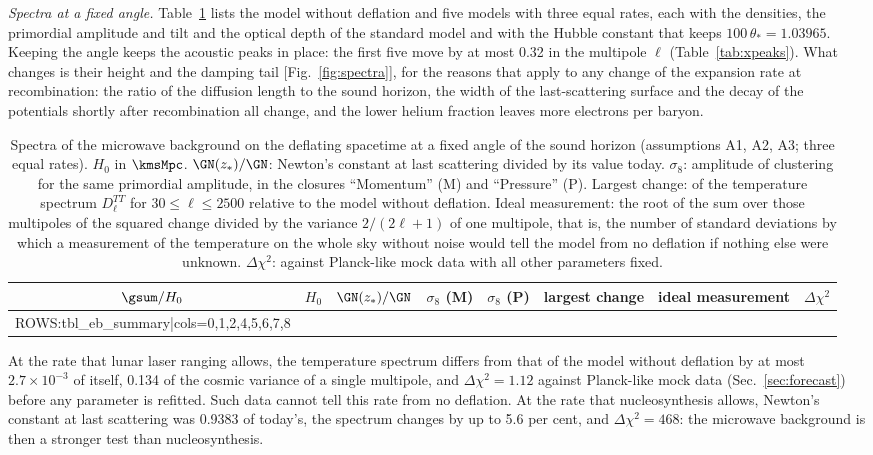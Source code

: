 \emph{Spectra at a fixed angle.} Table~\ref{tab:spectra} lists the model without deflation and
five models with three equal rates, each with the densities, the primordial amplitude and tilt and the optical depth of the standard
model and with the Hubble constant that keeps $100\,\theta_*=1.03965$. Keeping the angle keeps the
acoustic peaks in place: the first five move by at most 0.32 in the multipole $\ell$
(Table~\ref{tab:xpeaks}). What changes is
their height and the damping tail [Fig.~\ref{fig:spectra}], for the reasons that apply to any change
of the expansion rate at recombination: the ratio of the diffusion length to the sound horizon, the
width of the last-scattering surface and the decay of the potentials shortly after recombination all
change, and the lower helium fraction leaves more electrons per baryon.

\begin{table}
\caption{\label{tab:spectra}Spectra of the microwave background on the deflating spacetime at a fixed
angle of the sound horizon (assumptions A1, A2, A3; three equal rates). $H_0$ in $\kmsMpc$.
$\GN(z_*)/\GN$: Newton's constant at last scattering divided by its value today. $\sigma_8$:
amplitude of clustering for the same primordial amplitude, in the closures ``Momentum'' (M) and
``Pressure'' (P). Largest change: of the temperature spectrum $D_\ell^{TT}$ for $30\le\ell\le2500$
relative to the model without deflation. Ideal measurement: the root of the sum over those
multipoles of the squared change divided by the variance $2/(2\ell+1)$ of one multipole, that is,
the number of standard deviations by which a measurement of the temperature on the whole sky without
noise would tell the model from no deflation if nothing else were unknown. $\Delta\chi^{2}$: against
Planck-like mock data with all other parameters fixed.}
\begin{ruledtabular}
\begin{tabular}{cccccccc}
$\gsum/H_0$ & $H_0$ & $\GN(z_*)/\GN$ & $\sigma_8$ (M) & $\sigma_8$ (P) & largest change & ideal measurement & $\Delta\chi^{2}$ \\
\hline
{{ROWS:tbl_eb_summary|cols=0,1,2,4,5,6,7,8}}
\end{tabular}
\end{ruledtabular}
\end{table}

At the rate that lunar laser ranging allows, the temperature spectrum differs from that of the
model without deflation by at most $2.7\times10^{-3}$ of itself, 0.134 of the cosmic variance of a
single multipole, and $\Delta\chi^{2}=1.12$ against Planck-like mock data
(Sec.~\ref{sec:forecast}) before any parameter is refitted. Such data cannot tell this rate from no
deflation. At the rate that nucleosynthesis allows, Newton's constant at last scattering was 0.9383
of today's, the spectrum changes by up to 5.6 per cent, and $\Delta\chi^{2}=468$: the microwave
background is then a stronger test than nucleosynthesis.

